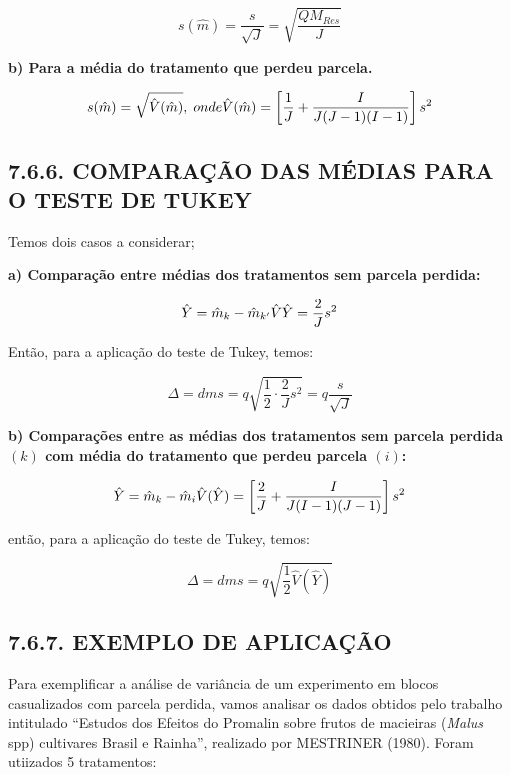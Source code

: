 \documentclass[
]{book}
\begin{document}
\[
s(\hat{m})=\frac{s}{\sqrt{J}}=\sqrt{\frac{QM_{Res}}{J}}
\]

\textbf{b) Para a média do tratamento que perdeu parcela.}

\[
s(\hat{m})= \sqrt{\hat{V}(\hat{m})},\; onde \\
\hat{V}(\hat{m}) = \left[ \frac{1}{J}+\frac{I}{J(J-1)(I-1)} \right]s^2
\]

\hypertarget{comparauxe7uxe3o-das-muxe9dias-para-o-teste-de-tukey}{%
\subsection{7.6.6. COMPARAÇÃO DAS MÉDIAS PARA O TESTE DE TUKEY}\label{comparauxe7uxe3o-das-muxe9dias-para-o-teste-de-tukey}}

Temos dois casos a considerar;

\textbf{a) Comparação entre médias dos tratamentos sem parcela perdida:}

\[
\hat{Y} = \hat{m}_k-\hat{m}_{k'} \\
\hat{V}\hat{Y}=\frac{2}{J}s^2
\]

Então, para a aplicação do teste de Tukey, temos:

\[
\Delta = dms=q\sqrt{\frac{1}{2}\cdot\frac{2}{J}s^2}=q\frac{s}{\sqrt{J}}
\]

\textbf{b) Comparações entre as médias dos tratamentos sem parcela perdida \((k)\) com média do tratamento que perdeu parcela \((i)\):}

\[
\hat{Y} = \hat{m}_k-\hat{m}_{i} \\
\hat{V}(\hat{Y})=\left[\frac{2}{J}+\frac{I}{J(I-1)(J-1)} \right]s^2
\]

então, para a aplicação do teste de Tukey, temos:

\[
\Delta = dms = q\sqrt{\frac{1}{2}\hat{V}(\hat{Y})}
\]

\hypertarget{exemplo-de-aplicauxe7uxe3o-1}{%
\subsection{7.6.7. EXEMPLO DE APLICAÇÃO}\label{exemplo-de-aplicauxe7uxe3o-1}}

Para exemplificar a análise de variância de um experimento em blocos casualizados com parcela perdida, vamos analisar os dados obtidos pelo trabalho intitulado ``Estudos dos Efeitos do Promalin sobre frutos de macieiras (\emph{Malus} spp) cultivares Brasil e Rainha'', realizado por MESTRINER (1980). Foram utiizados 5 tratamentos:
\end{document}
